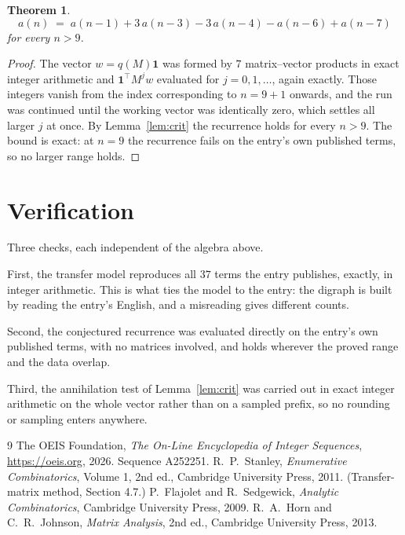 \documentclass[11pt,a4paper]{article}
\theoremstyle{plain}
\newtheorem{theorem}{Theorem}
\theoremstyle{definition}
\begin{document}
\begin{theorem}
\[
a(n)\;=\;a(n-1) + 3\,a(n-3) - 3\,a(n-4) - a(n-6) + a(n-7)
\]
for every $n>9$.
\end{theorem}

\begin{proof}
The vector $w=q(M)\mathbf{1}$ was formed by $7$ matrix--vector products in exact
integer arithmetic and $\mathbf{1}^{\!\top}M^{j}w$ evaluated for $j=0,1,\dots$, again
exactly. Those integers vanish from the index corresponding to $n=9+1$ onwards, and the
run was continued until the working vector was identically zero, which settles all larger $j$
at once. By Lemma~\ref{lem:crit} the recurrence holds for every $n>9$. The bound is exact: at $n=9$ the recurrence fails on the entry's own published terms, so no larger range holds.
\end{proof}

\section{Verification}

Three checks, each independent of the algebra above.

First, the transfer model reproduces all $37$ terms the entry publishes, exactly, in
integer arithmetic. This is what ties the model to the entry: the digraph is built by reading
the entry's English, and a misreading gives different counts.

Second, the conjectured recurrence was evaluated directly on the entry's own published terms,
with no matrices involved, and holds wherever the proved range and the data overlap.

Third, the annihilation test of Lemma~\ref{lem:crit} was carried out in exact integer
arithmetic on the whole vector rather than on a sampled prefix, so no rounding or sampling
enters anywhere.

\begin{thebibliography}{9}
 The OEIS Foundation, \emph{The On-Line Encyclopedia of Integer
Sequences}, \url{https://oeis.org}, 2026. Sequence A252251.
 R.~P.~Stanley, \emph{Enumerative Combinatorics}, Volume 1, 2nd ed.,
Cambridge University Press, 2011. (Transfer-matrix method, Section 4.7.)
 P.~Flajolet and R.~Sedgewick, \emph{Analytic Combinatorics}, Cambridge
University Press, 2009.
 R.~A.~Horn and C.~R.~Johnson, \emph{Matrix Analysis}, 2nd ed., Cambridge
University Press, 2013.
\end{thebibliography}
\end{document}

